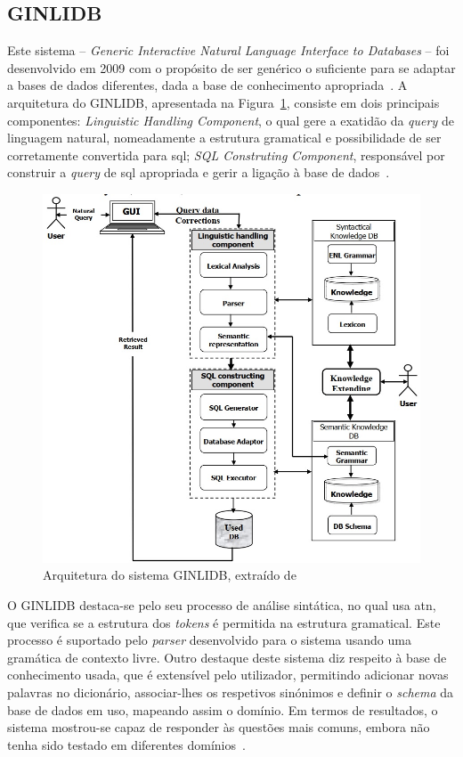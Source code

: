 \subsection{GINLIDB}
Este sistema -- \textit{Generic Interactive Natural Language Interface to Databases} -- foi desenvolvido em 2009 com o propósito de ser genérico o suficiente para se adaptar a bases de dados diferentes, dada a base de conhecimento apropriada~\parencite{ginlidb}. A arquitetura do GINLIDB, apresentada na Figura~\ref{fig:ginlidb_architecture}, consiste em dois principais componentes: \textit{Linguistic Handling Component}, o qual gere a exatidão da \textit{query} de linguagem natural, nomeadamente a estrutura gramatical e possibilidade de ser corretamente convertida para \gls{sql}; \textit{SQL Construting Component}, responsável por construir a \textit{query} de \gls{sql} apropriada e gerir a ligação à base de dados~\parencite{ginlidb}.

\begin{figure}[!ht]
    \centering
    \includegraphics[width=.62\textwidth]{ch03/assets/ginlidb_architecture.jpg}
    \caption{Arquitetura do sistema GINLIDB, extraído de~\textcite{ginlidb}}
    \label{fig:ginlidb_architecture}
\end{figure}

O GINLIDB destaca-se pelo seu processo de análise sintática, no qual usa \gls{atn}, que verifica se a estrutura dos \textit{tokens} é permitida na estrutura gramatical. Este processo é suportado pelo \textit{parser} desenvolvido para o sistema usando uma gramática de contexto livre. Outro destaque deste sistema diz respeito à base de conhecimento usada, que é extensível pelo utilizador, permitindo adicionar novas palavras no dicionário, associar-lhes os respetivos sinónimos e definir o \textit{schema} da base de dados em uso, mapeando assim o domínio. Em termos de resultados, o sistema mostrou-se capaz de responder às questões mais comuns, embora não tenha sido testado em diferentes domínios~\parencite{ginlidb}.

